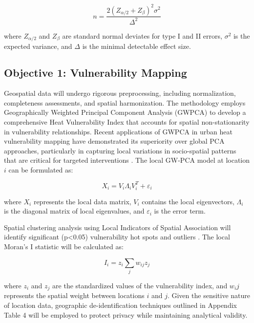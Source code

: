 \begin{equation}
n = \frac{2(Z_{\alpha/2} + Z_{\beta})^2\sigma^2}{\Delta^2}
\end{equation}

where $Z_{\alpha/2}$ and $Z_{\beta}$ are standard normal deviates for type I and II errors, $\sigma^2$ is the expected variance, and $\Delta$ is the minimal detectable effect size.

\subsection{Objective 1: Vulnerability Mapping}
Geospatial data will undergo rigorous preprocessing, including normalization, completeness assessments, and spatial harmonization. The methodology employs Geographically Weighted Principal Component Analysis (GWPCA) \citep{Harris2011, Quispe2023} to develop a comprehensive Heat Vulnerability Index that accounts for spatial non-stationarity in vulnerability relationships. Recent applications of GWPCA in urban heat vulnerability mapping have demonstrated its superiority over global PCA approaches, particularly in capturing local variations in socio-spatial patterns that are critical for targeted interventions \citep{Quispe2023, Praharaj2024}. The local GW-PCA model at location $i$ can be formulated as:

\begin{equation}
X_i = V_i\Lambda_iV^T_i + \varepsilon_i
\end{equation}

where $X_i$ represents the local data matrix, $V_i$ contains the local eigenvectors, $\Lambda_i$ is the diagonal matrix of local eigenvalues, and $\varepsilon_i$ is the error term.

Spatial clustering analysis using Local Indicators of Spatial Association will identify significant (p<0.05) vulnerability hot spots and outliers \citep{Anselin1995}. The local Moran's I statistic will be calculated as:

\begin{equation}
I_i = z_i \sum_{j} w_{ij}z_j
\end{equation}

where $ z_i$ and $ z_j$ are the standardized values of the vulnerability index, and $ w_ij$ represents the spatial weight between locations $ i$ and $ j$. Given the sensitive nature of location data, geographic de-identification techniques outlined in Appendix Table 4 will be employed to protect privacy while maintaining analytical validity.

